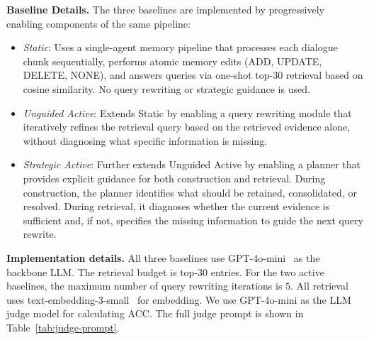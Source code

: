 \noindent\textbf{Baseline Details.}
The three baselines are implemented by progressively enabling components of the same pipeline:
\begin{itemize}[leftmargin=*]
\item \emph{Static}: Uses a single-agent memory pipeline that processes each dialogue chunk sequentially, performs atomic memory edits (\textsc{ADD}, \textsc{UPDATE}, \textsc{DELETE}, \textsc{NONE}), and answers queries via one-shot top-$30$ retrieval based on cosine similarity. No query rewriting or strategic guidance is used.
\item \emph{Unguided Active}: Extends Static by enabling a query rewriting module that iteratively refines the retrieval query based on the retrieved evidence alone, without diagnosing what specific information is missing.
\item \emph{Strategic Active}: Further extends Unguided Active by enabling a planner that provides explicit guidance for both construction and retrieval. During construction, the planner identifies what should be retained, consolidated, or resolved. During retrieval, it diagnoses whether the current evidence is sufficient and, if not, specifies the missing information to guide the next query rewrite.
\end{itemize}




\noindent\textbf{Implementation details.}
All three baselines use GPT-4o-mini~\cite{gpt4ocard} as the backbone LLM.
The retrieval budget is top-$30$ entries.
For the two active baselines, the maximum number of query rewriting iterations is $5$.
All retrieval uses text-embedding-3-small~\cite{openai2024embedding3} for embedding. We use GPT-4o-mini as the LLM judge model for calculating ACC. The full judge prompt is shown in Table~\ref{tab:judge-prompt}.


